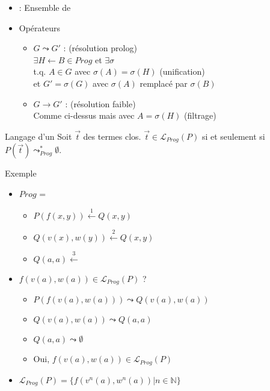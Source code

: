 \begin{frame}{\csprogramme}
  \begin{itemize}[<+->]
  \item \csprogramme : Ensemble de \csclauses
  \item Opérateurs
    \begin{itemize}
    \item $G \leadsto G'$ : (résolution prolog) \\
      $\exists H \leftarrow B \in Prog$ et $\exists \sigma$ \\
      t.q. $A \in G$ avec $\sigma(A) = \sigma(H)$ (unification)\\
      et $G' = \sigma(G)$ avec $\sigma(A)$ remplacé par $\sigma(B)$
    \item $G \rightarrow G'$ : (résolution faible) \\
      Comme ci-dessus mais avec $A = \sigma(H)$ (filtrage)
    \end{itemize}
  \end{itemize}
  \begin{block}{Langage d'un \csprogramme}
    Soit $\vec{t}$ des termes clos.
    $\vec{t} \in \mathcal{L}_{Prog}(P)$ si et seulement si $P(\vec{t}) \leadsto^*_{Prog} \emptyset$.
  \end{block}
\end{frame}

\begin{frame}{Exemple}
  \begin{itemize}[<+->]
  \item $Prog$ =
    \begin{itemize}
    \item {}$P(f(x,y)) \stackrel{1}{\leftarrow} Q(x, y)$ \\
    \item {}$Q(v(x), w(y)) \stackrel{2}{\leftarrow} Q(x, y)$ \\
    \item {}$Q(a, a) \stackrel{3}{\leftarrow} $
    \end{itemize}
  \item $f(v(a),w(a)) \in \mathcal{L}_{Prog}(P)$ ?
    \begin{itemize}
    \item $P(f(v(a),w(a))) \leadsto Q(v(a), w(a))$ \\
    \item $Q(v(a), w(a)) \leadsto Q(a, a)$ \\
    \item $Q(a, a) \leadsto \emptyset$
    \item Oui, $f(v(a),w(a)) \in \mathcal{L}_{Prog}(P)$
    \end{itemize}
  \item $\mathcal{L}_{Prog}(P) = \{f(v^n(a),w^n(a)) | n \in \mathbb{N}\}$
  \end{itemize}
\end{frame}

